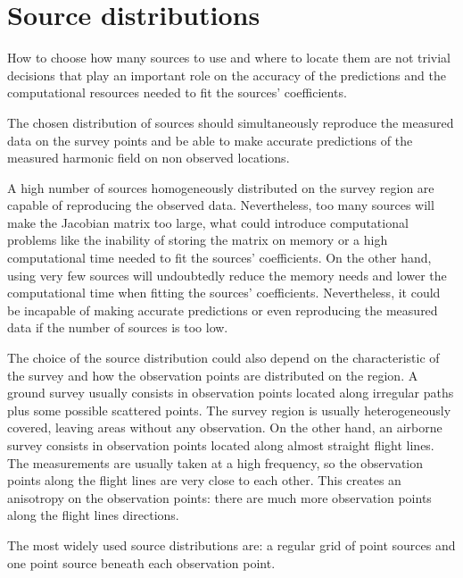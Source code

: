 \documentclass[twocolumn]{article}
\begin{document}

\section{Source distributions}


How to choose how many sources to use and where to locate them are not
trivial decisions that play an important role on the accuracy of the
predictions and the computational resources needed to fit the sources'
coefficients.

The chosen distribution of sources should simultaneously reproduce the measured
data on the survey points and be able to make accurate predictions of the
measured harmonic field on non observed locations.

A high number of sources homogeneously distributed on the survey region are
capable of reproducing the observed data. Nevertheless, too many sources will
make the Jacobian matrix too large, what could introduce computational problems
like the inability of storing the matrix on memory or a high computational time
needed to fit the sources' coefficients.
On the other hand, using very few sources will undoubtedly reduce the memory
needs and lower the computational time when fitting the sources' coefficients.
Nevertheless, it could be incapable of making accurate predictions or even
reproducing the measured data if the number of sources is too low.

The choice of the source distribution could also depend on the characteristic
of the survey and how the observation points are distributed on the region.
A ground survey usually consists in observation points located along irregular
paths plus some possible scattered points.
The survey region is usually heterogeneously covered, leaving areas without any
observation.
On the other hand, an airborne survey consists in observation points located
along almost straight flight lines. The measurements are usually taken at
a high frequency, so the observation points along the flight lines are very
close to each other.
This creates an anisotropy on the observation points: there are much more
observation points along the flight lines directions.

The most widely used source distributions are: a regular grid of point sources
and one point source beneath each observation point.
\end{document}
